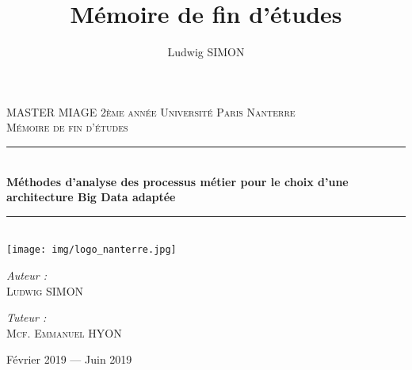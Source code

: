 \documentclass[12pt, twoside, openright]{report}
\author{Ludwig SIMON}
\title{Mémoire de fin d'études}
\begin{document}
%

\setlength{\parindent}{0cm}
\setlength{\parskip}{1ex plus 0.5ex minus 0.2ex}
\newcommand{\hsp}{\hspace{20pt}}
\newcommand{\HRule}{\rule{\linewidth}{0.5mm}}

\begin{titlepage}
  \begin{sffamily}
  \begin{center}

    \textsc{\LARGE MASTER MIAGE 2ème année \linebreak Université Paris Nanterre}\\[2cm]

    \textsc{\Large Mémoire de fin d'études}\\[1.5cm]

    \HRule \\[0.4cm]
    { \huge \bfseries Méthodes d'analyse des processus métier pour le choix d'une architecture Big Data adaptée\\[0.4cm] }

    \HRule \\[2cm]
    \texttt{[image: img/logo\_nanterre.jpg]}
    \hspace{2cm}
    
    \vfill
  \begin{minipage}{0.4\textwidth}
      \begin{flushleft} \large
        \emph{Auteur :}\\ \textsc{Ludwig SIMON}\\
      \end{flushleft}
    \end{minipage}
    \begin{minipage}{0.4\textwidth}
      \begin{flushright} \large
        \emph{Tuteur :}\\ \textsc{Mcf. Emmanuel HYON}\\
      \end{flushright}
    \end{minipage}
    \vfill
    {\large Février 2019 — Juin 2019}
  \end{center}
  \end{sffamily}
\end{titlepage}
\end{document}
